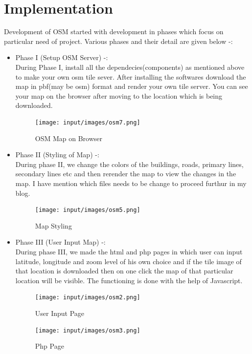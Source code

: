\section{Implementation}
Development of OSM started with development in phases which focus on particular need of project.
Various phases and their detail are given below -:
\begin{itemize}
\item Phase I (Setup OSM Server) -: \\
        During Phase I, install all the dependecies(components) as mentioned above to make your own osm tile sever. After installing the softwares download the map in pbf(may be osm) format and render your own tile server. You can see your map on the browser after moving to the location which is being downloaded.

\begin{figure}[ht]
\centering \texttt{[image: input/images/osm7.png]}
\caption{OSM Map on Browser}
\end{figure}

\item Phase II (Styling of Map) -: \\
        During phase II, we change the colors of the buildings, roads, primary lines, secondary lines etc and then rerender the map to view the changes in the map. I have mention which files needs to be change to proceed furthur in my blog.  
\begin{figure}[ht]
\centering \texttt{[image: input/images/osm5.png]}
\caption{Map Styling}
\end{figure}

\item Phase III (User Input Map) -: \\
        During phase III, we made the html and php pages in which user can input latitude, longitude and zoom level of his own choice and if the tile image of that location is downloaded then on one click the map of that particular location will be visible. The functioning is done with the help of Javascript.
\begin{figure}[ht]
\centering \texttt{[image: input/images/osm2.png]}
\caption{User Input Page}
\end{figure}

\begin{figure}[ht]
\centering \texttt{[image: input/images/osm3.png]}
\caption{Php Page}
\end{figure}


\end{itemize}
